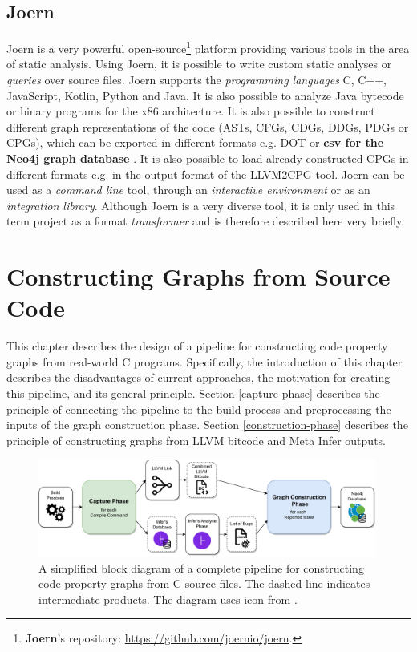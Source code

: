 \section{Joern}
\label{joern}

Joern \cite{joern-website} is a very powerful open-source\footnote{\textbf{Joern}'s repository: \url{https://github.com/joernio/joern}.} platform providing various tools in the area of static analysis. Using Joern, it is possible to write custom static analyses or \textit{queries} over source files. Joern supports the \textit{programming languages} C, C++, JavaScript, Kotlin, Python and Java. It is also possible to analyze Java bytecode or binary programs for the x86 architecture. It is also possible to construct different graph representations of the code (ASTs, CFGs, CDGs, DDGs, PDGs or CPGs), which can be exported in different formats e.g. DOT \cite{DOT} or \textbf{csv for the Neo4j graph database} \cite{neo4j-webpage}. It is also possible to load already constructed CPGs in different formats e.g. in the output format of the LLVM2CPG tool. Joern can be used as a \textit{command line} tool, through an \textit{interactive environment} or as an \textit{integration library}. Although Joern is a very diverse tool, it is only used in this term project as a format \textit{transformer} and is therefore described here very briefly.


\chapter{Constructing Graphs from Source Code}
\label{pipeline}

This chapter describes the design of a pipeline for constructing code property graphs from real-world C programs. Specifically, the introduction of this chapter describes the disadvantages of current approaches, the motivation for creating this pipeline, and its general principle. Section \ref{capture-phase} describes the principle of connecting the pipeline to the build process and preprocessing the inputs of the graph construction phase. Section \ref{construction-phase} describes the principle of constructing graphs from LLVM bitcode and Meta Infer outputs.

\begin{figure}[hbt]
	\centering
	\includegraphics[width=0.99\textwidth]{figures/all.drawio.pdf}
	\caption{A simplified block diagram of a complete pipeline for constructing code property graphs from C source files. The dashed line indicates intermediate products. The diagram uses icon from \cite{infer-web}.}
	\label{figure:pipeline-all}
\end{figure}

